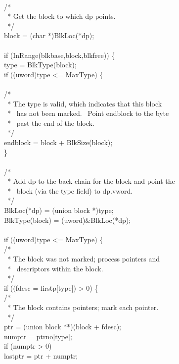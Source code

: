\begin{iconcode}
\\
\>/*\\
\>\ * Get the block to which dp points.\\
\>\ */\\
\>block = (char *)BlkLoc(*dp);\\
\\
\>if (InRange(blkbase,block,blkfree)) \{\\
\>\>type = BlkType(block);\\
\>\>if ((uword)type <= MaxType) \{\\
\\
\>\>\>/*\\
\>\>\>\ * The type is valid, which indicates that this block\\
\>\>\>\ * \ has not been marked. \ Point endblock to the byte\\
\>\>\>\ * \ past the end of the block.\\
\>\>\>\ */\\
\>\>\>endblock = block + BlkSize(block);\\
\>\>\>\}\\
\\
\>\>/*\\
\>\>\ * Add dp to the back chain for the block and point the\\
\>\>\ * \ block (via the type field) to dp.vword.\\
\>\>\ */\\
\>\>BlkLoc(*dp) = (union block *)type;\\
\>\>BlkType(block) = (uword)\&BlkLoc(*dp);\\
\\
\>\>if ((uword)type <= MaxType) \{\\
\>\>\>/*\\
\>\>\>\ * The block was not marked; process pointers and\\
\>\>\>\ * \ descriptors within the block.\\
\>\>\>\ */\\
\>\>\>if ((fdesc = firstp[type]) > 0) \{\\
\>\>\>\>/*\\
\>\>\>\>\ * The block contains pointers; mark each pointer.\\
\>\>\>\>\ */\\
\>\>\>\>ptr = (union block **)(block + fdesc);\\
\>\>\>\>numptr = ptrno[type];\\
\>\>\>\>if (numptr > 0)\\
\>\>\>\>\>lastptr = ptr + numptr;\\

\end{iconcode}
